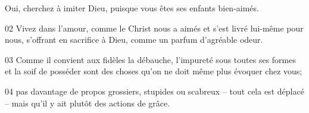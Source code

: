 Oui, cherchez à imiter Dieu, puisque vous êtes ses enfants bien-aimés.

02 Vivez dans l’amour, comme le Christ nous a aimés et s’est livré lui-même pour nous, s’offrant en sacrifice à Dieu, comme un parfum d’agréable odeur.

03 Comme il convient aux fidèles la débauche, l’impureté sous toutes ses formes et la soif de posséder sont des choses qu’on ne doit même plus évoquer chez vous;

04 pas davantage de propos grossiers, stupides ou scabreux – tout cela est déplacé – mais qu’il y ait plutôt des actions de grâce.
